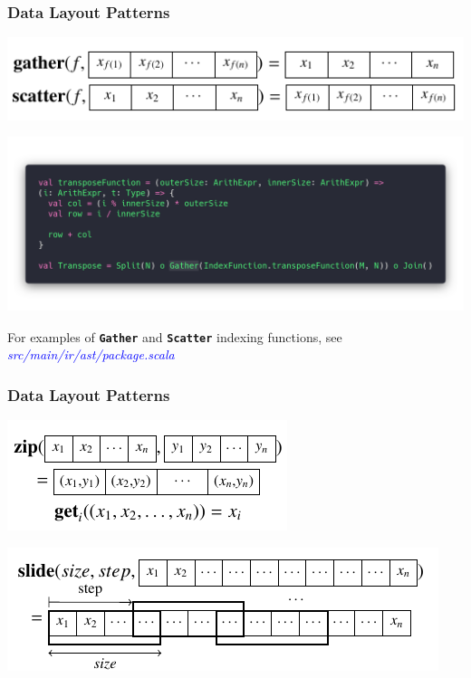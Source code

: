 \documentclass[10pt]{beamer}
\newcommand{\srcurl}[1]{\textcolor{blue}{\textit{#1}}}
\newcommand{\code}[1]{\textbf{\texttt{#1}}}
\begin{document}
\begin{frame}
\frametitle{Data Layout Patterns}
    \vspace{-.5cm}
    \begin{block}{}
        \begin{center}
            \includegraphics[width=.85\textwidth]{../images/data_layout_patterns2.pdf}
        \end{center}
        \vspace{-.5cm}
        \begin{center}
            \includegraphics[width=.85\textwidth]{../images/gather.png}
        \end{center}
    \end{block}
    \vspace{-.5cm}
\begin{center}
	For examples of \code{Gather} and \code{Scatter} indexing functions, see \srcurl{src/main/ir/ast/package.scala}
\end{center}
\end{frame}

\begin{frame}
\frametitle{Data Layout Patterns}
    \begin{block}{}
        \begin{center}
            \includegraphics[width=.55\textwidth]{../images/data_layout_patterns3.pdf}
        \end{center}
        \begin{center}
            \includegraphics[width=.85\textwidth]{../images/data_layout_patterns4.pdf}
        \end{center}
    \end{block}
\end{frame}
\end{document}
